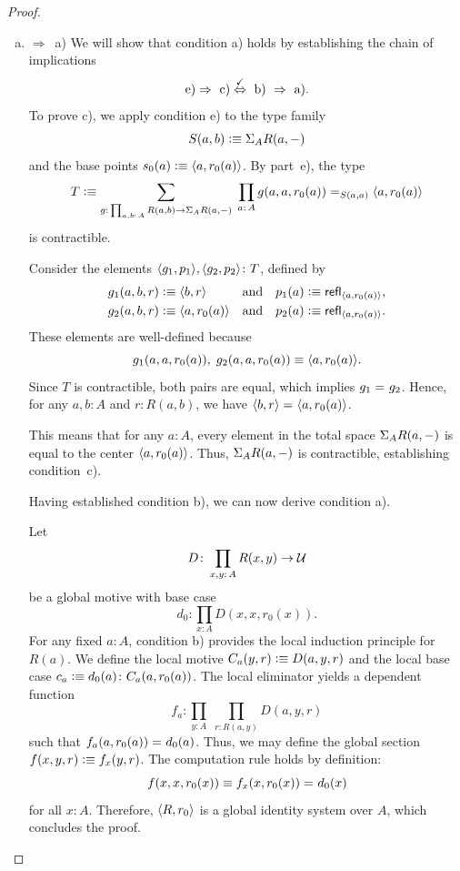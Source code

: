 \begin{proof}
\begin{enumerate}[a),font=\upshape]
        \item $\Rightarrow$~a) We will show that condition a) holds by establishing the chain of implications
        \[
        \text{e)}
            \Rightarrow\text{ c)}
            \stackrel{\mathstrut\checkmark}\Leftrightarrow\text{ b) }
            \Rightarrow\text{ a)}.
        \]
        To prove c), we apply condition e) to the type family
        \[
            S(a,b)\mathrel{\vcentcolon}\equiv\Sigma_AR(a,{\mathord-})
        \]
        and the base points $s_0(a)\mathrel{\vcentcolon}\equiv\langle a,r_0(a)\rangle$. By part~e), the type
        \[
            T\defeq\sum_{
                g\colon\prod_{a,b\colon A}
                    R(a,b)\to\Sigma_AR(a,\dummy)
                }\;
                \prod_{a\colon A}
                    g(a,a,r_0(a))
                    \eq{S(a,a)}
                    \dep{a,r_0(a)}
        \]
        is contractible.
        
        Consider the elements
        $\dep{g_1,p_1}, \dep{g_2,p_2}\colon T$, defined by
        \begin{align*}
            g_1(a,b,r)&\mathrel{\vcentcolon}\equiv\langle b,r\rangle
            &\text{and}&&
            p_1(a)&\mathrel{\vcentcolon}\equiv\mathsf{refl}_{\langle a,r_0(a)\rangle},\\
            g_2(a,b,r)&\mathrel{\vcentcolon}\equiv\langle a,r_0(a)\rangle
            &\text{and}&&
            p_2(a)&\mathrel{\vcentcolon}\equiv\mathsf{refl}_{\langle a,r_0(a)\rangle}.
        \end{align*}
        These elements are well-defined because
        \[
            g_1(a,a,r_0(a)),\;g_2(a,a,r_0(a))
                \equiv\langle a,r_0(a)\rangle.
        \]
        Since $T$ is contractible, both pairs are equal, which implies $g_1\mathrel{=_{}}g_2$. Hence, for any $a,b\colon A$ and $r\colon R(a,b)$, we have $\langle b,r\rangle\mathrel{=_{}}\langle a,r_0(a)\rangle$. 
        
        This means that for any $a\colon A$, every element in the total space $\Sigma_AR(a,{\mathord-})$ is equal to the center $\langle a,r_0(a)\rangle$. Thus, $\Sigma_AR(a,{\mathord-})$ is contractible, establishing condition~c).
    
        Having established condition b), we can now derive condition a).
        
        Let
        \[
            D\colon\prod_{x,y\colon A}R(x,y)\to\univ
        \]
        be a global motive with base case
        \[
            d_0\colon\prod_{x\colon A}D(x,x,r_0(x)).
        \]
        For any fixed $a\colon A$, condition b) provides the local induction principle for $R(a)$. We define the local motive $C_a(y,r)\mathrel{\vcentcolon}\equiv D(a,y,r)$ and the local base case $c_a\defeq d_0(a)\colon C_a(a,r_0(a))$. The local eliminator yields a dependent function
        \[
            f_a\colon\prod_{y\colon A}\;\prod_{r\colon R(a,y)}D(a,y,r)
        \]
        such that $f_a(a,r_0(a))\mathrel{=_{}}d_0(a)$. Thus, we may define the global section $f(x,y,r)\mathrel{\vcentcolon}\equiv f_x(y,r)$. The computation rule holds by definition:
        \[
            f(x,x,r_0(x))\equiv f_x(x,r_0(x))\mathrel{=_{}}d_0(x)
        \]
        for all $x\colon A$. Therefore, $\langle R,r_0\rangle$ is a global identity system over $A$, which concludes the proof.
    \end{enumerate}
    
\end{proof}

